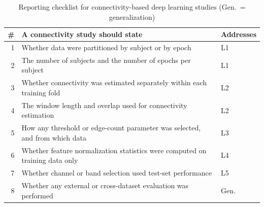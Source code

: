 \begin{table}[t]
\caption{Reporting checklist for connectivity-based deep learning studies (Gen.\ = generalization)}
\label{tab:checklist}
\centering
\small
\begin{tabular}{@{}r p{} l@{}}
\toprule
\# & A connectivity study should state & Addresses \\
\midrule
1 & Whether data were partitioned by subject or by epoch & L1 \\
2 & The number of subjects and the number of epochs per subject & L1 \\
3 & Whether connectivity was estimated separately within each training fold & L2 \\
4 & The window length and overlap used for connectivity estimation & L2 \\
5 & How any threshold or edge-count parameter was selected, and from which data & L3 \\
6 & Whether feature normalization statistics were computed on training data only & L4 \\
7 & Whether channel or band selection used test-set performance & L5 \\
8 & Whether any external or cross-dataset evaluation was performed & Gen. \\
\bottomrule
\end{tabular}
\end{table}
